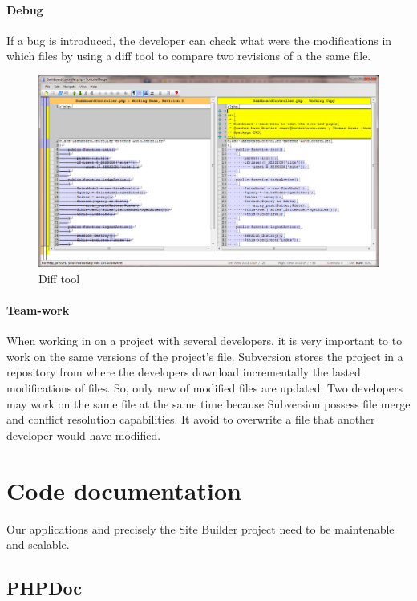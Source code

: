 \paragraph*{Debug}
If a bug is introduced, the developer can check what were the modifications in which files by using a diff tool to compare two revisions of a the same file.

\begin{figure}[!ht]
\centering
\includegraphics[width=.85\textwidth]{img/diff.png}
\caption{Diff tool}
\label{figure:diff}
\end{figure}

\paragraph*{Team-work}
When working in on a project with several developers, it is very important to to work on the same versions of the project's file. Subversion stores the project in a repository from where the developers download incrementally the lasted modifications of files. So, only new of modified files are updated. Two developers may work on the same file at the same time because Subversion possess file merge and conflict resolution capabilities. It avoid to overwrite a file that another developer would have modified.

\section{Code documentation}
Our applications and precisely the Site Builder project need to be maintenable and scalable. 
\subsection{PHPDoc}


